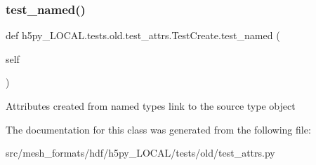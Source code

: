 \subsubsection{\texorpdfstring{test\+\_\+named()}{test\_named()}}
{\footnotesize\ttfamily def h5py\+\_\+\+L\+O\+C\+A\+L.\+tests.\+old.\+test\+\_\+attrs.\+Test\+Create.\+test\+\_\+named (\begin{DoxyParamCaption}\item[{}]{self }\end{DoxyParamCaption})}

\begin{DoxyVerb}Attributes created from named types link to the source type object
\end{DoxyVerb}
 

The documentation for this class was generated from the following file\+:\begin{DoxyCompactItemize}
\item 
src/mesh\+\_\+formats/hdf/h5py\+\_\+\+L\+O\+C\+A\+L/tests/old/test\+\_\+attrs.\+py\end{DoxyCompactItemize}
